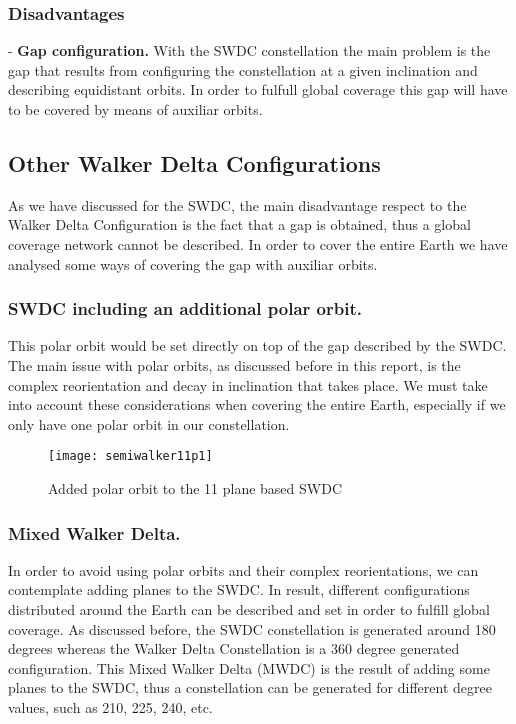 \subsubsection{Disadvantages}
-	\textbf{Gap configuration.} With the SWDC constellation the main problem is the gap that results from configuring the constellation at a given inclination and describing equidistant orbits. In order to fulfull global coverage this gap will have to be covered by means of auxiliar orbits.

\subsection{Other Walker Delta Configurations}
As we have discussed for the SWDC, the main disadvantage respect to the Walker Delta Configuration is the fact that a gap is obtained, thus a global coverage network cannot be described. In order to cover the entire Earth we have analysed some ways of covering the gap with auxiliar orbits.

\subsubsection{SWDC including an additional polar orbit.}
This polar orbit would be set directly on top of the gap described by the SWDC. The main issue with polar orbits, as discussed before in this report, is the complex reorientation and decay in inclination that takes place. We must take into account these considerations when covering the entire Earth, especially if we only have one polar orbit in our constellation. 

\begin{figure}[h]
\texttt{[image: semiwalker11p1]}
\centering
\caption{Added polar orbit to the 11 plane based SWDC}
\end{figure}

\subsubsection{Mixed Walker Delta.}
In order to avoid using polar orbits and their complex reorientations, we can contemplate adding planes to the SWDC. In result, different configurations distributed around the Earth can be described and set in order to fulfill global coverage. As discussed before, the SWDC constellation is generated around 180 degrees whereas the Walker Delta Constellation is a 360 degree generated configuration. This Mixed Walker Delta (MWDC) is the result of adding some planes to the SWDC, thus a constellation can be generated for different degree values, such as 210, 225, 240, etc. 

